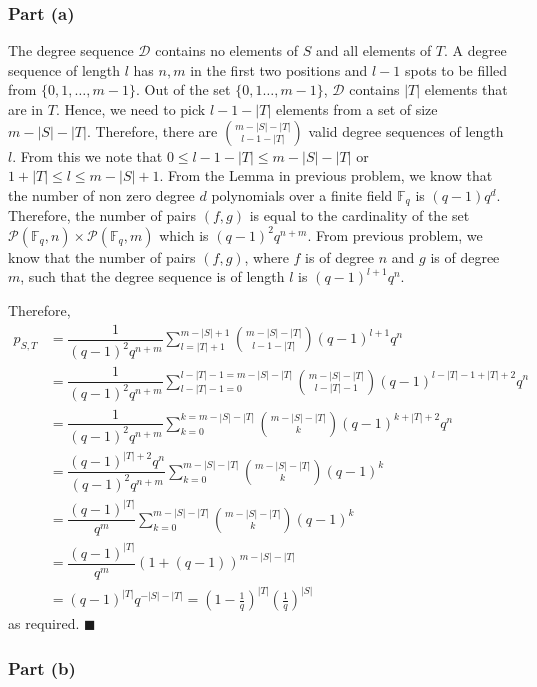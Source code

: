 \subsubsection{Part (a)}



The degree sequence $\mathcal{D}$ contains no elements of $S$ and all elements of $T$. A degree sequence of length $l$ has $n,m$ in the first two positions and $l-1$ spots to be filled from $\{0,1,\ldots, m-1\}$. Out of the set $\{0,1\ldots, m-1\}$, $\mathcal{D}$ contains $|T|$ elements that are in $T$. Hence, we need to pick $l-1-|T|$ elements from a set of size $m-|S|-|T|$. Therefore, there are $\binom{m-|S|-|T|}{l-1-|T|}$ valid degree sequences of length $l$. From this we note that $0\leq l-1-|T|\leq m-|S|-|T|$ or $1+|T|\leq l\leq m-|S|+1$. From the Lemma in previous problem, we know that the number of non zero degree $d$ polynomials over a finite field $\mathbb{F}_q$ is $(q-1)q^d$. Therefore, the number of pairs $(f,g)$ is equal to the cardinality of the set $\mathscr{P}(\mathbb{F}_q,n)\times\mathscr{P}(\mathbb{F}_q,m)$ which is $(q-1)^2 q^{n+m}$. From previous problem, we know that the number of pairs $(f,g)$, where $f$ is of degree $n$ and $g$ is of degree $m$, such that the degree sequence is of length $l$ is $(q-1)^{l+1}q^n$.

Therefore, 
\begin{align*}
    p_{S,T} &= \dfrac{1}{(q-1)^2 q^{n+m}}\sum_{l=|T|+1}^{m-|S|+1} \binom{m-|S|-|T|}{l-1-|T|} (q-1)^{l+1}q^n \\
    &= \dfrac{1}{(q-1)^2 q^{n+m}}\sum_{l-|T|-1=0}^{l-|T|-1=m-|S|-|T|} \binom{m-|S|-|T|}{l-|T|-1} (q-1)^{l-|T|-1 + |T|+2}q^n \\
    &= \dfrac{1}{(q-1)^2 q^{n+m}}\sum_{k=0}^{k=m-|S|-|T|} \binom{m-|S|-|T|}{k} (q-1)^{k+|T|+2}q^n \\
    &=\dfrac{(q-1)^{|T|+2}q^n}{(q-1)^2 q^{n+m}}\sum_{k=0}^{m-|S|-|T|} \binom{m-|S|-|T|}{k} (q-1)^{k} \\
    &= \dfrac{(q-1)^{|T|}}{q^{m}}\sum_{k=0}^{m-|S|-|T|} \binom{m-|S|-|T|}{k} (q-1)^{k} \\
    &= \dfrac{(q-1)^{|T|}}{q^{m}}(1+(q-1))^{m-|S|-|T|} \\
    &= (q-1)^{|T|}q^{-|S|-|T|} = \left(1-\frac{1}{q}\right)^{|T|}\left(\frac{1}{q}\right)^{|S|}
\end{align*}
as required. \hfill $\blacksquare$

\subsubsection{Part (b)}

